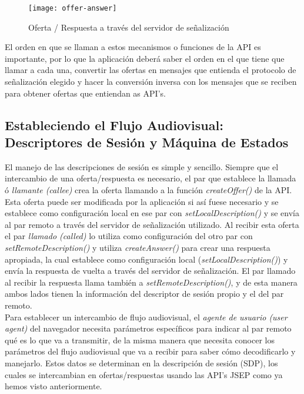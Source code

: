 \begin{figure}[htb]
\centering
\texttt{[image: offer-answer]}
\caption{Oferta / Respuesta a través del servidor de señalización}
\label{fig:oferta-respuesta}
\end{figure}


El orden en que se llaman a estos mecanismos o funciones de la API es importante, por lo que la aplicación deberá saber el orden en el que tiene que llamar a cada una, convertir las ofertas en mensajes que entienda el protocolo de señalización elegido y hacer la conversión inversa con los mensajes que se reciben para obtener ofertas que entiendan as API's.\\


\subsection{Estableciendo el Flujo Audiovisual: Descriptores de Sesión y Máquina de Estados}


El manejo de las descripciones de sesión es simple y sencillo. Siempre que el intercambio de una oferta/respuesta es necesario, el par que establece la llamada ó \textit{llamante (callee)} crea la oferta llamando a la función \emph{createOffer()} de la API. Esta oferta puede ser modificada por la aplicación si así fuese necesario y se establece como configuración local en ese par con \emph{setLocalDescription()} y se envía al par remoto a través del servidor de señalización utilizado. Al recibir esta oferta el par \textit{llamado (called)} lo utiliza como configuración del otro par con \emph{setRemoteDescription()} y utiliza \emph{createAnswer()} para crear una respuesta apropiada, la cual establece como configuración local (\emph{setLocalDescription()}) y envía la respuesta de vuelta a través del servidor de señalización. El par llamado al recibir la respuesta llama también a \emph{setRemoteDescription()}, y de esta manera ambos lados tienen la información del descriptor de sesión propio y el del par remoto.\\ 

Para establecer un intercambio de flujo audiovisual, el \textit{agente de usuario (user agent)} del navegador necesita parámetros específicos para indicar al par remoto qué es lo que va a transmitir, de la misma manera que necesita conocer los parámetros del flujo audiovisual que va a recibir para saber cómo decodificarlo y manejarlo. Estos datos se determinan en la descripción de sesión (SDP), los cuales se intercambian en ofertas/respuestas usando las API's JSEP como ya hemos visto anteriormente.\\

